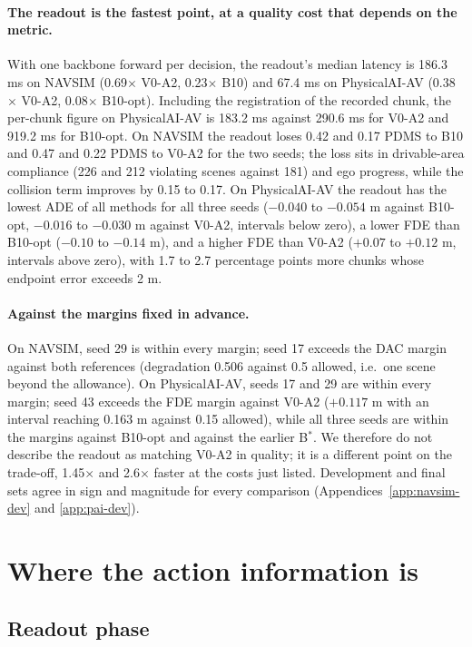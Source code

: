 \documentclass[10pt]{article}
\newcommand{\Bstar}{B$^{*}$}
\newcommand{\VA}[2]{V#1-A#2}
\begin{document}
\paragraph{The readout is the fastest point, at a quality cost that depends on the metric.} With one backbone forward per decision, the readout's median latency is 186.3 ms on NAVSIM (0.69$\times$ \VA{0}{2}, 0.23$\times$ B10) and 67.4 ms on PhysicalAI-AV (0.38$\times$ \VA{0}{2}, 0.08$\times$ B10-opt). Including the registration of the recorded chunk, the per-chunk figure on PhysicalAI-AV is 183.2 ms against 290.6 ms for \VA{0}{2} and 919.2 ms for B10-opt. On NAVSIM the readout loses 0.42 and 0.17 PDMS to B10 and 0.47 and 0.22 PDMS to \VA{0}{2} for the two seeds; the loss sits in drivable-area compliance (226 and 212 violating scenes against 181) and ego progress, while the collision term improves by 0.15 to 0.17. On PhysicalAI-AV the readout has the lowest ADE of all methods for all three seeds ($-0.040$ to $-0.054$ m against B10-opt, $-0.016$ to $-0.030$ m against \VA{0}{2}, intervals below zero), a lower FDE than B10-opt ($-0.10$ to $-0.14$ m), and a higher FDE than \VA{0}{2} ($+0.07$ to $+0.12$ m, intervals above zero), with 1.7 to 2.7 percentage points more chunks whose endpoint error exceeds 2 m.

\paragraph{Against the margins fixed in advance.} On NAVSIM, seed 29 is within every margin; seed 17 exceeds the DAC margin against both references (degradation 0.506 against 0.5 allowed, i.e.\ one scene beyond the allowance). On PhysicalAI-AV, seeds 17 and 29 are within every margin; seed 43 exceeds the FDE margin against \VA{0}{2} ($+0.117$ m with an interval reaching 0.163 m against 0.15 allowed), while all three seeds are within the margins against B10-opt and against the earlier \Bstar{}. We therefore do not describe the readout as matching \VA{0}{2} in quality; it is a different point on the trade-off, 1.45$\times$ and 2.6$\times$ faster at the costs just listed. Development and final sets agree in sign and magnitude for every comparison (Appendices~\ref{app:navsim-dev} and \ref{app:pai-dev}).

\section{Where the action information is}
\label{sec:where}

\subsection{Readout phase}
\label{sec:phase}
\end{document}
